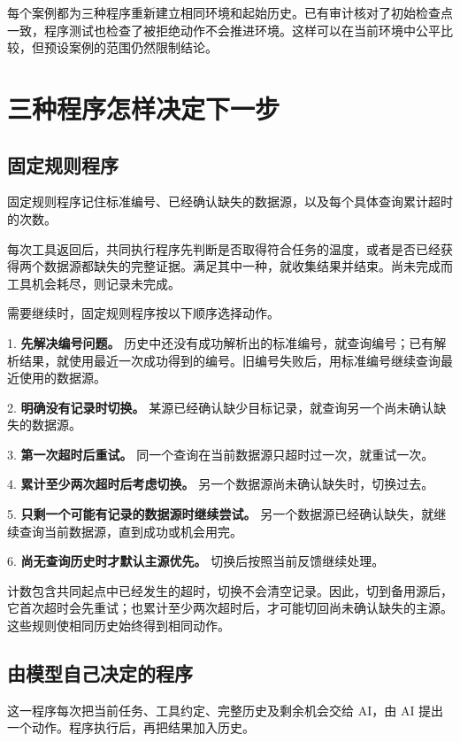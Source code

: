 \documentclass[12pt,a4paper,UTF8,fontset=none]{ctexart}
\begin{document}
每个案例都为三种程序重新建立相同环境和起始历史。已有审计核对了初始检查点一致，程序测试也检查了被拒绝动作不会推进环境。这样可以在当前环境中公平比较，但预设案例的范围仍然限制结论。


\section{三种程序怎样决定下一步}

\subsection{固定规则程序}

固定规则程序记住标准编号、已经确认缺失的数据源，以及每个具体查询累计超时的次数。


每次工具返回后，共同执行程序先判断是否取得符合任务的温度，或者是否已经获得两个数据源都缺失的完整证据。满足其中一种，就收集结果并结束。尚未完成而工具机会耗尽，则记录未完成。


需要继续时，固定规则程序按以下顺序选择动作。


1. \textbf{先解决编号问题。} 历史中还没有成功解析出的标准编号，就查询编号；已有解析结果，就使用最近一次成功得到的编号。旧编号失败后，用标准编号继续查询最近使用的数据源。

2. \textbf{明确没有记录时切换。} 某源已经确认缺少目标记录，就查询另一个尚未确认缺失的数据源。

3. \textbf{第一次超时后重试。} 同一个查询在当前数据源只超时过一次，就重试一次。

4. \textbf{累计至少两次超时后考虑切换。} 另一个数据源尚未确认缺失时，切换过去。

5. \textbf{只剩一个可能有记录的数据源时继续尝试。} 另一个数据源已经确认缺失，就继续查询当前数据源，直到成功或机会用完。

6. \textbf{尚无查询历史时才默认主源优先。} 切换后按照当前反馈继续处理。


计数包含共同起点中已经发生的超时，切换不会清空记录。因此，切到备用源后，它首次超时会先重试；也累计至少两次超时后，才可能切回尚未确认缺失的主源。这些规则使相同历史始终得到相同动作。


\subsection{由模型自己决定的程序}

这一程序每次把当前任务、工具约定、完整历史及剩余机会交给 AI，由 AI 提出一个动作。程序执行后，再把结果加入历史。
\end{document}
